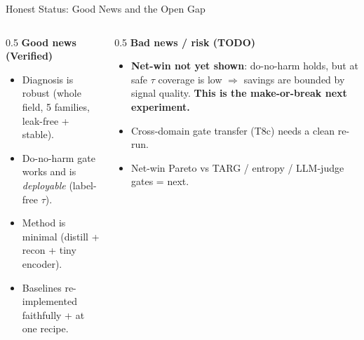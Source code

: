 \begin{frame}{Honest Status: Good News and the Open Gap}
  \small
  \begin{columns}[T]
    \begin{column}{0.5\textwidth}
      \textbf{Good news (Verified)}
      \begin{itemize}\scriptsize
        \item Diagnosis is robust (whole field, 5 families, leak-free + stable).
        \item Do-no-harm gate works and is \emph{deployable} (label-free $\tau$).
        \item Method is minimal (distill + recon + tiny encoder).
        \item Baselines re-implemented faithfully + at one recipe.
      \end{itemize}
    \end{column}
    \begin{column}{0.5\textwidth}
      \textbf{Bad news / risk (TODO)}
      \begin{itemize}\scriptsize
        \item \textbf{Net-win not yet shown}: do-no-harm holds, but at safe $\tau$ coverage is low $\Rightarrow$ savings are bounded by signal quality. \textbf{This is the make-or-break next experiment.}
        \item Cross-domain gate transfer (T8c) needs a clean re-run.
        \item Net-win Pareto vs TARG / entropy / LLM-judge gates = next.
      \end{itemize}
    \end{column}
  \end{columns}
\end{frame}

